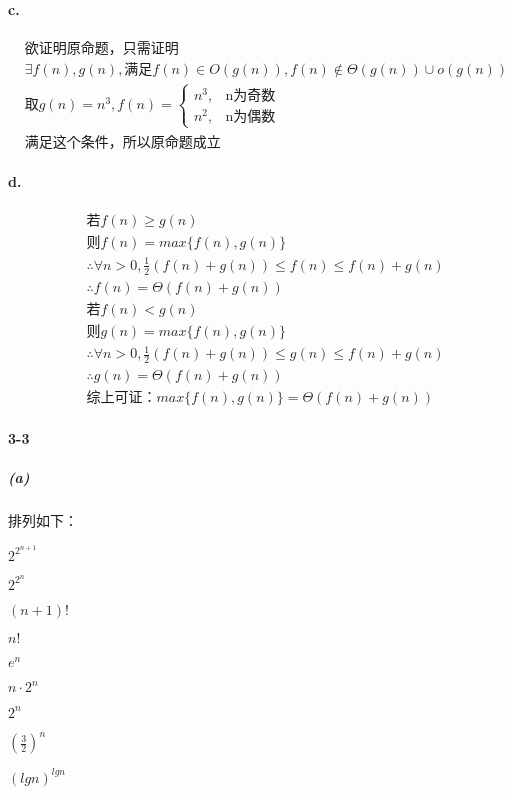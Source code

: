 \documentclass[UTF8]{ctexart}
\begin{document}
\paragraph{c.}
\begin{align*}
    &\text{欲证明原命题，只需证明}\\
    &\exists f(n),g(n),\text{满足}f(n)\in O(g(n)),f(n)\notin\Theta(g(n))\cup o(g(n))\\
    &\text{取}g(n)=n^3,f(n)=\begin{cases}
        n^3,&\text{n为奇数}\\
        n^2,&\text{n为偶数}
    \end{cases}\\
    &\text{满足这个条件，所以原命题成立}
\end{align*}

\paragraph{d.}
\begin{align*}
    &\text{若}f(n)\ge g(n)\\
    &\text{则}f(n)=max\{f(n),g(n)\}\\
    &\therefore \forall n>0, \frac{1}{2}(f(n)+g(n))\le f(n)\le f(n)+g(n)\\
    &\therefore f(n)=\Theta(f(n)+g(n))\\
    &\text{若}f(n)<g(n)\\
    &\text{则}g(n)=max\{f(n),g(n)\}\\
    &\therefore \forall n>0, \frac{1}{2}(f(n)+g(n))\le g(n)\le f(n)+g(n)\\
    &\therefore g(n)=\Theta(f(n)+g(n))\\
    &\text{综上可证：}max\{f(n),g(n)\}=\Theta(f(n)+g(n))
\end{align*}

\paragraph{3-3}
\subparagraph{(a)}
排列如下：

$2^{2^{n+1}}$

$2^{2^n}$

$(n+1)!$

$n!$

$e^n$

$n\cdot2^n$

$2^n$

$(\frac{3}{2})^n$

$(lgn)^{lgn}$
\end{document}
